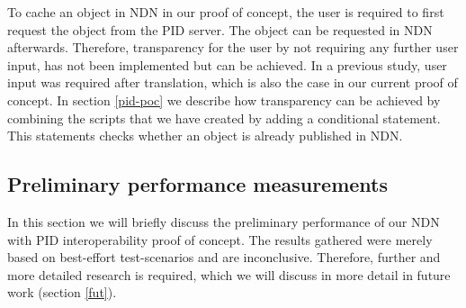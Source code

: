 To cache an object in NDN in our proof of concept, the user is required to first request the object from the PID server. The object can be requested in NDN afterwards. Therefore, transparency for the user by not requiring any further user input, has not been implemented but can be achieved. In a previous study, user input was required after translation, which is also the case in our current proof of concept. In section \ref{pid-poc} we describe how transparency can be achieved by combining the scripts that we have created by adding a conditional statement. This statements checks whether an object is already published in NDN.




\subsection{Preliminary performance measurements}
\label{discussion-performance}
In this section we will briefly discuss the preliminary performance of our NDN with PID interoperability proof of concept. The results gathered were merely based on best-effort test-scenarios and are inconclusive. Therefore, further and more detailed research is required, which we will discuss in more detail in future work (section \ref{fut}).

